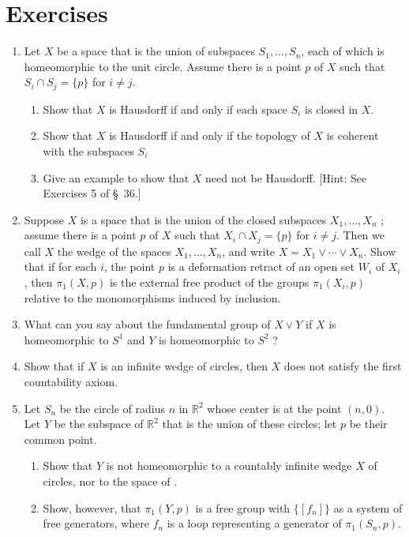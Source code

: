 \section*{Exercises}
\begin{enumerate}[itemsep=0.4em, parsep=0pt, topsep=0pt, partopsep=0pt, leftmargin=*, label=\arabic*., ref=\arabic*]
\item Let \(X\) be a space that is the union of subspaces \(S_{1},\ldots ,S_{n}\), each of which is homeomorphic to the unit circle. Assume there is a point \(p\) of \(X\) such that \(S_{i} \cap {S}_{j} = \{ p\}\) for \(i \neq j\).
 \begin{enumerate}[itemsep=0.2em, parsep=0pt, topsep=0pt, partopsep=0pt, leftmargin=*, label=(\alph*), align=left]
 \item Show that \(X\) is Hausdorff if and only if each space \(S_{i}\) is closed in \(X\).
 \item Show that \(X\) is Hausdorff if and only if the topology of \(X\) is coherent with the subspaces \(S_{i}\)
 \item Give an example to show that \(X\) need not be Hausdorff. [Hint: See Exercises 5 of \S\ 36.]
 \end{enumerate}
\item Suppose \(X\) is a space that is the union of the closed subspaces \(X_{1},\ldots ,X_{n}\) ; assume there is a point \(p\) of \(X\) such that \(X_{i} \cap {X}_{j} = \{ p\}\) for \(i \neq j\). Then we call \(X\) the wedge of the spaces \(X_{1},\ldots ,X_{n}\), and write \(X = X_{1} \vee \cdots \vee {X}_{n}\). Show that if for each \(i\), the point \(p\) is a deformation retract of an open set \(W_{i}\) of \(X_{i}\), then \({\pi }_{1}( {X,p})\) is the external free product of the groups \({\pi }_{1}( {X_{i},p})\) relative to the monomorphisms induced by inclusion.
\item What can you say about the fundamental group of \(X \vee Y\) if \(X\) is homeomorphic to \(S^{1}\) and \(Y\) is homeomorphic to \(S^{2}\) ?
\item Show that if \(X\) is an infinite wedge of circles, then \(X\) does not satisfy the first countability axiom.
\item Let \(S_{n}\) be the circle of radius \(n\) in \(\mathbb{R}^{2}\) whose center is at the point \(( {n,0})\). Let \(Y\) be the subspace of \(\mathbb{R}^{2}\) that is the union of these circles; let \(p\) be their common point.
 \begin{enumerate}[itemsep=0.2em, parsep=0pt, topsep=0pt, partopsep=0pt, leftmargin=*, label=(\alph*), align=left]
 \item Show that \(Y\) is not homeomorphic to a countably infinite wedge \(X\) of circles, nor to the space of .
 \item Show, however, that \({\pi }_{1}( {Y,p})\) is a free group with \(\{ [ f_{n}] \}\) as a system of free generators, where \(f_{n}\) is a loop representing a generator of \({\pi }_{1}( {S_{n},p})\).
 \end{enumerate}
\end{enumerate}

